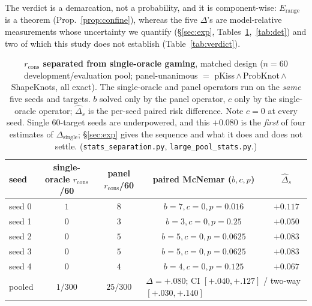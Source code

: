 \documentclass[11pt]{article}
\begin{document}
\noindent The verdict is a demarcation, not a probability, and it is component-wise:
$E_{\mathrm{range}}$ is a theorem (Prop.~\ref{prop:confine}), whereas the five $\Delta$'s are model-relative
measurements whose uncertainty we quantify (\S\ref{sec:exp}, Tables~\ref{tab:sep},~\ref{tab:det}) and two of
which this study does not establish (Table~\ref{tab:verdict}).

\begin{table}[t]\centering\small
\setlength{\tabcolsep}{4.5pt}\renewcommand{\arraystretch}{1.15}
\caption{\textbf{$r_{\mathrm{cons}}$ separated from single-oracle gaming}, matched design ($n{=}60$
development/evaluation pool; panel-unanimous $=$ pKiss\,$\wedge$\,ProbKnot\,$\wedge$\,ShapeKnots, all exact).
The single-oracle and panel operators run on the \emph{same} five seeds and targets. $b$ solved only by the panel operator,
$c$ only by the single-oracle operator; $\widehat\Delta_s$ is the per-seed paired risk difference. Note $c{=}0$ at every seed.
Single $60$-target seeds are underpowered, and this ${+}0.080$ is the \emph{first} of four estimates of
$\Delta_{\mathrm{single}}$; \S\ref{sec:exp} gives the sequence and what it does and does not settle.
(\texttt{stats\_separation.py}, \texttt{large\_pool\_stats.py}.)}\label{tab:sep}
\begin{tabularx}{\linewidth}{@{}Xcccc@{}}
\toprule
\textbf{seed} & \textbf{single-oracle $r_{\mathrm{cons}}$/60} & \textbf{panel $r_{\mathrm{cons}}$/60} & \textbf{paired McNemar ($b,c,p$)} & $\widehat\Delta_s$\\
\midrule
seed 0 & $1$ & $8$ & $b{=}7,c{=}0,p{=}0.016$ & $+0.117$\\
seed 1 & $0$ & $3$ & $b{=}3,c{=}0,p{=}0.25$ & $+0.050$\\
seed 2 & $0$ & $5$ & $b{=}5,c{=}0,p{=}0.0625$ & $+0.083$\\
seed 3 & $0$ & $5$ & $b{=}5,c{=}0,p{=}0.0625$ & $+0.083$\\
seed 4 & $0$ & $4$ & $b{=}4,c{=}0,p{=}0.125$ & $+0.067$\\
\midrule
pooled & $1/300$ & $25/300$ & \multicolumn{2}{l}{$\Delta{=}{+}.080$; CI $[{+}.040,{+}.127]$ / two-way $[{+}.030,{+}.140]$}\\
\bottomrule
\end{tabularx}
\end{table}
\end{document}
